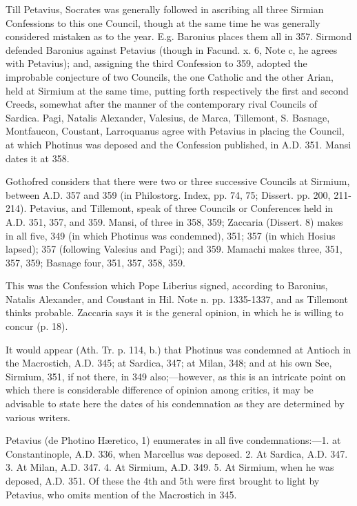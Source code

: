 Till Petavius, Socrates was generally followed in ascribing all
three Sirmian Confessions to this one Council, though at the same time
he was generally considered mistaken as to the year. E.g. Baronius
places them all in 357. Sirmond defended Baronius against Petavius
(though in Facund. x. 6, Note c, he agrees with Petavius); and,
assigning the third Confession to 359, adopted the improbable
conjecture of two Councils, the one Catholic and the other Arian, held
at Sirmium at the same time, putting forth respectively the first and
second Creeds, somewhat after the manner of the contemporary rival
Councils of Sardica. Pagi, Natalis Alexander, Valesius, de Marca,
Tillemont, S. Basnage, Montfaucon, Coustant, Larroquanus agree with
Petavius in placing the Council, at which Photinus was deposed and the
Confession published, in A.D. 351. Mansi dates
it at 358.

Gothofred considers that there were two or three successive
Councils at Sirmium, between A.D. 357 and 359
(in Philostorg. Index, pp. 74, 75; Dissert. pp. 200, 211-214).
Petavius, and Tillemont, speak of three Councils or Conferences held
in A.D. 351, 357, and 359. Mansi, of three in
358, 359; Zaccaria (Dissert. 8) makes in all five, 349 (in which
Photinus was condemned), 351; 357 (in which Hosius lapsed); 357
(following Valesius and Pagi); and 359. Mamachi makes three, 351, 357,
359; Basnage four, 351, 357, 358, 359.

This was the Confession which Pope Liberius signed, according to
Baronius, Natalis Alexander, and Coustant in Hil. Note n. pp.
1335-1337, and as Tillemont thinks probable. Zaccaria says it is the
general opinion, in which he is willing to concur (p. 18).

It would appear (Ath. Tr. p. 114, b.) that Photinus was condemned
at Antioch in the Macrostich, A.D. 345; at
Sardica, 347; at Milan, 348; and at his own See, Sirmium, 351, if not
there, in 349 also;—however, as this is an intricate point on which
there is considerable difference of opinion among critics, it may be
advisable to state here the dates of his condemnation as they are
determined by various writers.

Petavius (de Photino Hæretico, 1) enumerates in all five
condemnations:—1. at Constantinople, A.D. 336,
when Marcellus was deposed. 2. At Sardica, A.D.
347. 3. At Milan, A.D. 347. 4. At Sirmium, A.D.
349. 5. At Sirmium, when he was deposed, A.D.
351. Of these the 4th and 5th were first brought to light by Petavius,
who omits mention of the Macrostich in 345.

